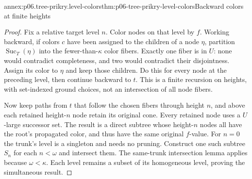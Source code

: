 \begin{annexitem}{annex:p06.tree-prikry.level-colors}{thm:p06-tree-prikry-level-colors}{Backward colors at finite heights}
\begin{proof}
Fix a relative target level \(n\). Color nodes on that level by \(f\).
Working backward, if colors \(c\) have been assigned to the children
of a node \(\eta\), partition \(\operatorname{Suc}_T(\eta)\) into
the fewer-than-\(\kappa\) color fibers. Exactly one fiber is in \(U\):
none would contradict completeness, and two would contradict their
disjointness. Assign its color to \(\eta\) and keep those children.
Do this for every node at the preceding level, then continue backward
to \(t\). This is a finite recursion on heights, with set-indexed
ground choices, not an intersection of all node fibers.

Now keep paths from \(t\) that follow the chosen fibers through height
\(n\), and above each retained height-\(n\) node retain its original
cone. Every retained node uses a \(U\)-large successor set. The result
is a direct subtree whose height-\(n\) nodes all have the root's
propagated color, and thus have the same original \(f\)-value.
For \(n=0\) the trunk's level is a singleton and needs no pruning.
Construct one such subtree \(S_n\) for each \(n<\omega\) and intersect
them. The same-trunk intersection lemma applies because
\(\omega<\kappa\). Each level remains a subset of its homogeneous
level, proving the simultaneous result.
\end{proof}
\end{annexitem}


